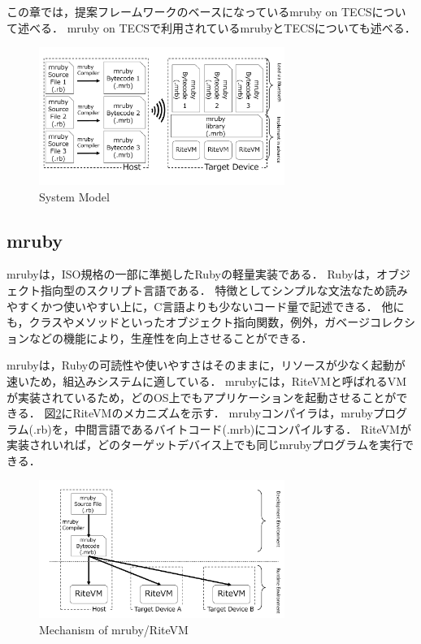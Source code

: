 \documentclass[submit]{ipsj_v2/UTF8/ipsj}
\begin{document}
この章では，提案フレームワークのベースになっているmruby on TECSについて述べる．
mruby on TECSで利用されているmrubyとTECSについても述べる．

\begin{figure}[t]
    \centering
    \includegraphics[width=8cm,clip]{../EMSOFT2016/figure/proposed.pdf}
    \caption{System Model}
    \label{fig:proposed}
\end{figure}

\subsection{mruby}
mrubyは，ISO規格の一部に準拠したRubyの軽量実装である．
Ruby\cite{url:Ruby}は，オブジェクト指向型のスクリプト言語である．
特徴としてシンプルな文法なため読みやすくかつ使いやすい上に，C言語よりも少ないコード量で記述できる．
他にも，クラスやメソッドといったオブジェクト指向関数，例外，ガベージコレクションなどの機能により，生産性を向上させることができる．

mrubyは，Rubyの可読性や使いやすさはそのままに，リソースが少なく起動が速いため，組込みシステムに適している．
mrubyには，RiteVMと呼ばれるVMが実装されているため，どのOS上でもアプリケーションを起動させることができる．
図\ref{fig:mruby}にRiteVMのメカニズムを示す．
mrubyコンパイラは，mrubyプログラム(.rb)を，中間言語であるバイトコード(.mrb)にコンパイルする．
RiteVMが実装されいれば，どのターゲットデバイス上でも同じmrubyプログラムを実行できる．

\begin{figure}[t]
    \centering
    \includegraphics[width=8cm,clip]{../EMSOFT2016/figure/mruby.pdf}
    \caption{Mechanism of mruby/RiteVM}
    \label{fig:mruby}
\end{figure}
\end{document}
